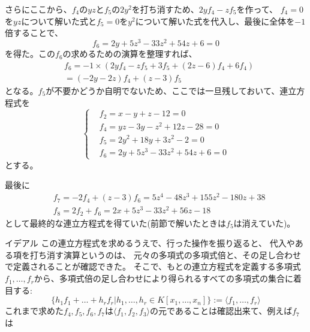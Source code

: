 \begin{frame}
	さらにここから、$f_4$の$yz$と$f_5$の$2y^2$を打ち消すため、$2yf_4-zf_5$を作って、
	$f_4=0$を$yz$について解いた式と$f_5=0$を$y^2$について解いた式を代入し、最後に全体を$-1$倍することで、
	\begin{equation*}
		f_6=2y+5z^3-33z^2+54z+6=0
	\end{equation*}
	を得た。この$f_6$の求めるための演算を整理すれば、
	\begin{align*}
		 & f_6=-1\times(2y f_4-z f_5+3 f_5+(2z-6) f_4+6 f_4) \\
		 & = (-2y-2z)f_4+(z-3)f_5
	\end{align*}
	となる。$f_5$が不要かどうか自明でないため、ここでは一旦残しておいて、連立方程式を
	\begin{equation*}
		\left\{
		\begin{aligned}
			 & f_2=x-y+z-12=0            \\
			 & f_4=yz-3y-z^2+12z-28=0    \\
			 & f_5=2y^2+18y+3z^2-2=0     \\
			 & f_6=2y+5z^3-33z^2+54z+6=0
		\end{aligned}
		\right.
	\end{equation*}
	とする。
\end{frame}

\begin{frame}
	最後に
	\begin{align*}
		 & f_7=-2f_4+(z-3)f_6=5z^4-48z^3+155z^2-180z+38 \\
		 & f_8=2f_2+f_6=2x+5z^3-33z^2+56z-18
	\end{align*}
	として最終的な連立方程式を得ていた(前節で解いたときは$f_5$は消えていた)。
\end{frame}

\begin{frame} {イデアル}
	この連立方程式を求めるうえで、行った操作を振り返ると、
	代入やある項を打ち消す演算というのは、
	元々の多項式の多項式倍と、その足し合わせで定義されることが確認できた。
	そこで、もとの連立方程式を定義する多項式$f_1,\ldots,f_r$から、多項式倍の足し合わせにより得られるすべての多項式の集合に着目する:
	\begin{equation}
		\{h_1f_1 + \ldots + h_r f_r | h_1, \ldots, h_r \in K[x_1,\ldots,x_n] \} := \langle f_1, \ldots, f_r\rangle
	\end{equation}
	これまで求めた$f_4,f_5,f_6,f_7$は$\langle f_1, f_2, f_3\rangle$の元であることは確認出来て、例えば$f_7$は
\end{frame}

